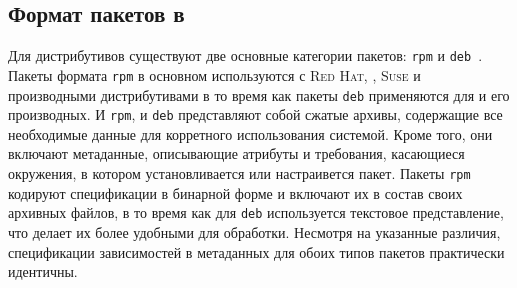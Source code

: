 \subsection{Формат пакетов в {\linux}}
\label{package-formats}
Для дистрибутивов {\linux} существуют две основные категории пакетов: \texttt{rpm} и \texttt{deb}~\cite{LinuxDependencyFormat}.
Пакеты формата \texttt{rpm} в основном используются с \textsc{Red Hat}, {\fedora}, \textsc{Suse} и производными дистрибутивами в то время как пакеты \texttt{deb} применяются для {\debian} и его производных.
И \texttt{rpm}, и \texttt{deb} представляют собой сжатые архивы, содержащие все необходимые данные для корретного использования системой. Кроме того, они включают метаданные, описывающие атрибуты и требования, касающиеся окружения, в котором установливается или настраивется пакет.
Пакеты \texttt{rpm} кодируют спецификации в бинарной форме и включают их в состав своих архивных файлов, в то время как для \texttt{deb} используется текстовое представление, что делает их более удобными для обработки.
Несмотря на указанные различия, спецификации зависимостей в метаданных для обоих типов пакетов практически идентичны.

